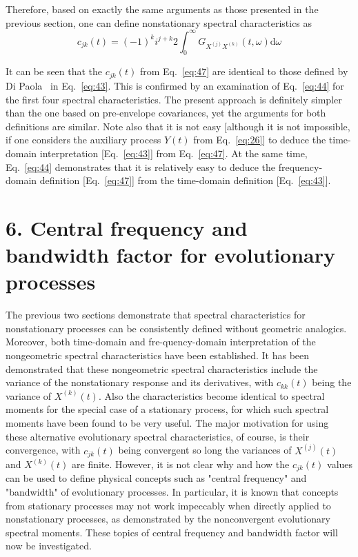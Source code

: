 \documentclass[12pt]{article}
\begin{document}
Therefore, based on exactly the same arguments as those presented in the previous section, one can define nonstationary spectral characteristics as
\begin{equation}
c_{j k}(t)=(-1)^{k} i^{j+k} 2 \int_{0}^{\infty} G_{X^{(j)} X^{(k)}}(t, \omega) \mathrm{d} \omega
\label{eq:47}
\end{equation}

It can be seen that the $c_{j k}(t)$ from Eq.~\eqref{eq:47} are identical to those defined by Di Paola~\cite{DiPaola1985} in Eq.~\eqref{eq:43}. This is confirmed by an examination of Eq.~\eqref{eq:44} for the first four spectral characteristics. The present approach is definitely simpler than the one based on pre-envelope covariances, yet the arguments for both definitions are similar. Note also that it is not easy [although it is not impossible, if one considers the auxiliary process $Y(t)$ from Eq.~\eqref{eq:26}] to deduce the time-domain
interpretation [Eq.~\eqref{eq:43}] from Eq.~\eqref{eq:47}. At the same time, Eq.~\eqref{eq:44} demonstrates that it is relatively easy to deduce the frequency-domain definition [Eq.~\eqref{eq:47}] from the time-domain definition [Eq.~\eqref{eq:43}].

\section*{6. Central frequency and bandwidth factor for evolutionary processes}

The previous two sections demonstrate that spectral characteristics for nonstationary processes can be consistently defined without geometric analogics. Moreover, both time-domain and fre-quency-domain interpretation of the nongeometric spectral characteristics have been established. It has been demonstrated that these nongeometric spectral characteristics include the variance of the nonstationary response and its derivatives, with $c_{k k}(t)$ being the variance of $X^{(k)}(t)$. Also the characteristics become identical to spectral moments for the special case of a stationary process, for which such spectral moments have been found to be very useful. The major motivation for using these alternative evolutionary spectral characteristics, of course, is their convergence, with $c_{j k}(t)$ being convergent so long the variances of $X^{(j)}(t)$ and $X^{(k)}(t)$ are finite. However, it is not clear why and how the $c_{j k}(t)$ values can be used to define physical concepts such as "central frequency" and "bandwidth" of evolutionary processes. In particular, it is known that concepts from stationary processes may not work impeccably when directly applied to nonstationary processes, as demonstrated by the nonconvergent evolutionary spectral moments. These topics of central frequency and bandwidth factor will now be investigated.
\end{document}
